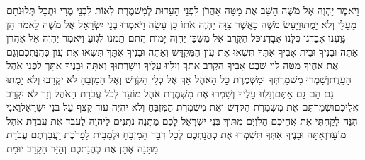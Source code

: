 \documentclass[../main/main.tex]{subfiles}
\begin{document}
\begin{multicols}{\ncols}
וַיֹּאמֶר יַהְוֶה אֶל מֹשֶׁה הָשֵׁב אֶת מַטֵּה אַהֲרֹן לִפְנֵי הָעֵדוּת לְמִשְׁמֶרֶת לְאוֹת לִבְנֵי מֶרִי וּתְכַל תְּלוּנֹּתָם מֵעָלַי וְלֹא יָמֻתוּ\PreVerseSpace{}וַיַּעַשׂ מֹשֶׁה כַּאֲשֶׁר צִוָּה יַהְוֶה אֹתוֹ כֵּן עָשָׂה \ClosedSection{}וַיֹּאמְרוּ בְּנֵי יִשְׂרָאֵל אֶל מֹשֶׁה לֵאמֹר הֵן גָּוַעְנוּ אָבַדְנוּ כֻּלָּנוּ אָבָדְנוּ\PreVerseSpace{}כֹּל הַקָּרֵב  אֶל מִשְׁכַּן יַהְוֶה יָמוּת הֲתֹם\SubEnd{} תַּמְנוּ לִגְוֺעַ \ClosedSection{}וַיֹּאמֶר יַהְוֶה אֶל אַהֲרֹן אַתָּה וּבָנֶיךָ וּבֵית אָבִיךָ אִתָּךְ תִּשְׂאוּ אֶת עֲוֺן הַמִּקְדָּשׁ וְאַתָּה וּבָנֶיךָ אִתָּךְ תִּשְׂאוּ אֶת עֲוֺן כְּהֻנַּתְכֶם\PreVerseSpace{}וְגַם אֶת אַחֶיךָ מַטֵּה לֵוִי שֵׁבֶט אָבִיךָ הַקְרֵב אִתָּךְ וְיִלָּווּ עָלֶיךָ וִישָׁרְתוּךָ וְאַתָּה וּבָנֶיךָ אִתָּךְ לִפְנֵי אֹהֶל הָעֵדֻת\PreVerseSpace{}וְשָׁמְרוּ מִשְׁמַרְתְּךָ וּמִשְׁמֶרֶת כָּל הָאֹהֶל אַךְ אֶל כְּלֵי הַקֹּדֶשׁ וְאֶל הַמִּזְבֵּחַ לֹא יִקְרָבוּ וְלֹא יָמֻתוּ גַם הֵם גַּם אַתֶּם\PreVerseSpace{}וְנִלְווּ עָלֶיךָ וְשָׁמְרוּ אֶת מִשְׁמֶרֶת אֹהֶל מוֹעֵד לְכֹל עֲבֹדַת הָאֹהֶל וְזָר לֹא יִקְרַב אֲלֵיכֶם\PreVerseSpace{}וּשְׁמַרְתֶּם אֵת מִשְׁמֶרֶת הַקֹּדֶשׁ וְאֵת מִשְׁמֶרֶת הַמִּזְבֵּחַ וְלֹא יִהְיֶה עוֹד קֶצֶף עַל בְּנֵי יִשְׂרָאֵל\PreVerseSpace{}וַאֲנִי הִנֵּה לָקַחְתִּי אֶת אֲחֵיכֶם הַלְוִיִּם מִתּוֹךְ בְּנֵי יִשְׂרָאֵל לָכֶם מַתָּנָה נְתֻנִים לַיהוָה לַעֲבֹד אֶת עֲבֹדַת אֹהֶל מוֹעֵד\PreVerseSpace{}וְאַתָּה וּבָנֶיךָ אִתְּךָ תִּשְׁמְרוּ אֶת כְּהֻנַּתְכֶם לְכָל דְּבַר הַמִּזְבֵּחַ וּלְמִבֵּית לַפָּרֹכֶת וַעֲבַדְתֶּם עֲבֹדַת מַתָּנָה אֶתֵּן אֶת כְּהֻנַּתְכֶם וְהַזָּר הַקָּרֵב יוּמָת\OpenSection{}\par

\end{multicols}
\end{document}
